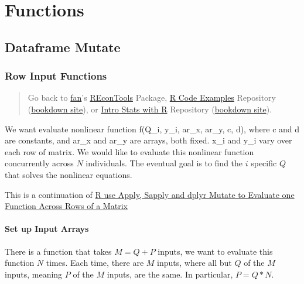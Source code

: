 \documentclass[
]{book}
\begin{document}
\hypertarget{functions}{%
\chapter{Functions}\label{functions}}

\hypertarget{dataframe-mutate}{%
\section{Dataframe Mutate}\label{dataframe-mutate}}

\hypertarget{row-input-functions}{%
\subsection{Row Input Functions}\label{row-input-functions}}

\begin{quote}
Go back to \href{http://fanwangecon.github.io/}{fan}'s \href{https://fanwangecon.github.io/REconTools/}{REconTools} Package, \href{https://fanwangecon.github.io/R4Econ/}{R Code Examples} Repository (\href{https://fanwangecon.github.io/R4Econ/bookdown}{bookdown site}), or \href{https://fanwangecon.github.io/Stat4Econ/}{Intro Stats with R} Repository (\href{https://fanwangecon.github.io/Stat4Econ/bookdown}{bookdown site}).
\end{quote}

We want evaluate nonlinear function f(Q\_i, y\_i, ar\_x, ar\_y, c, d), where c and d are constants, and ar\_x and ar\_y are arrays, both fixed. x\_i and y\_i vary over each row of matrix. We would like to evaluate this nonlinear function concurrently across \(N\) individuals. The eventual goal is to find the \(i\) specific \(Q\) that solves the nonlinear equations.

This is a continuation of \href{https://fanwangecon.github.io/R4Econ/function/noloop/fs_applysapplymutate.html}{R use Apply, Sapply and dplyr Mutate to Evaluate one Function Across Rows of a Matrix}

\hypertarget{set-up-input-arrays}{%
\subsubsection{Set up Input Arrays}\label{set-up-input-arrays}}

There is a function that takes \(M=Q+P\) inputs, we want to evaluate this function \(N\) times. Each time, there are \(M\) inputs, where all but \(Q\) of the \(M\) inputs, meaning \(P\) of the \(M\) inputs, are the same. In particular, \(P=Q*N\).
\end{document}
